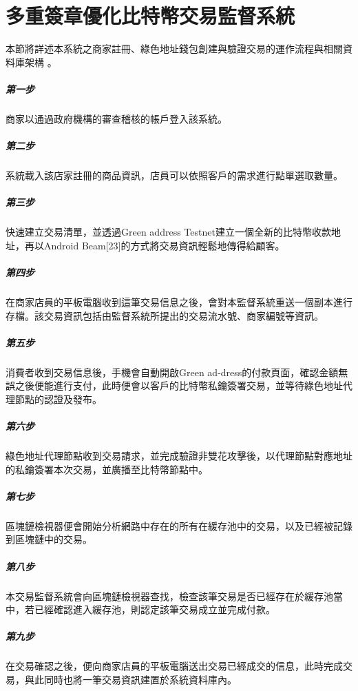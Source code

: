 
\chapter{多重簽章優化比特幣交易監督系統}
本節將詳述本系統之商家註冊、綠色地址錢包創建與驗證交易的運作流程與相關資料庫架構 。

	\paragraph{第一步}商家以通過政府機構的審查稽核的帳戶登入該系統。
	\paragraph{第二步}系統載入該店家註冊的商品資訊，店員可以依照客戶的需求進行點單選取數量。
	\paragraph{第三步}快速建立交易清單，並透過Green address Testnet建立一個全新的比特幣收款地址，再以Android Beam[23]的方式將交易資訊輕鬆地傳得給顧客。
	\paragraph{第四步}在商家店員的平板電腦收到這筆交易信息之後，會對本監督系統重送一個副本進行存檔。該交易資訊包括由監督系統所提出的交易流水號、商家編號等資訊。
	\paragraph{第五步}消費者收到交易信息後，手機會自動開啟Green ad-dress的付款頁面，確認金額無誤之後便能進行支付，此時便會以客戶的比特幣私鑰簽署交易，並等待綠色地址代理節點的認證及發布。
	\paragraph{第六步}綠色地址代理節點收到交易請求，並完成驗證非雙花攻擊後，以代理節點對應地址的私鑰簽署本次交易，並廣播至比特幣節點中。
	\paragraph{第七步}區塊鏈檢視器便會開始分析網路中存在的所有在緩存池中的交易，以及已經被記錄到區塊鏈中的交易。
	\paragraph{第八步}本交易監督系統會向區塊鏈檢視器查找，檢查該筆交易是否已經存在於緩存池當中，若已經確認進入緩存池，則認定該筆交易成立並完成付款。
	\paragraph{第九步}在交易確認之後，便向商家店員的平板電腦送出交易已經成交的信息，此時完成交易，與此同時也將一筆交易資訊建置於系統資料庫內。
